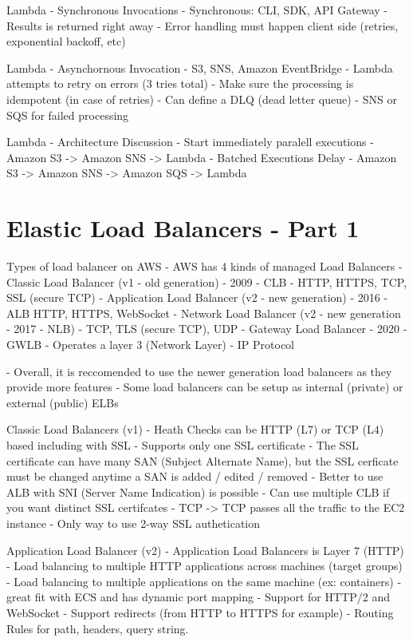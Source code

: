Lambda - Synchronous Invocations
- Synchronous: CLI, SDK, API Gateway
- Results is returned right away
- Error handling must happen client side (retries, exponential backoff, etc)

Lambda - Asynchornous Invocation
- S3, SNS, Amazon EventBridge
- Lambda attempts to retry on errors (3 tries total)
- Make sure the processing is idempotent (in case of retries)
- Can define a DLQ (dead letter queue) - SNS or SQS for failed processing

Lambda - Architecture Discussion
- Start immediately paralell executions
- Amazon S3 -> Amazon SNS -> Lambda
- Batched Executions Delay
- Amazon S3 -> Amazon SNS -> Amazon SQS -> Lambda


\section{Elastic Load Balancers - Part 1}
Types of load balancer on AWS
- AWS has 4 kinds of managed Load Balancers
- Classic Load Balancer (v1 - old generation) - 2009 - CLB
- HTTP, HTTPS, TCP, SSL (secure TCP)
- Application Load Balancer (v2 - new generation) - 2016 - ALB
HTTP, HTTPS, WebSocket
- Network Load Balancer (v2 - new generation - 2017 - NLB)
- TCP, TLS (secure TCP), UDP
- Gateway Load Balancer - 2020 - GWLB
- Operates a layer 3 (Network Layer) - IP Protocol

- Overall, it is reccomended to use the newer generation load balancers as they provide more features
- Some load balancers can be setup as internal (private) or external (public) ELBs

Classic Load Balancers (v1)
- Heath Checks can be HTTP (L7) or TCP (L4) based including with SSL
- Supports only one SSL certificate
- The SSL certificate can have many SAN (Subject Alternate Name), but the SSL cerficate must be changed anytime a SAN is added / edited / removed
- Better to use ALB with SNI (Server Name Indication) is possible
- Can use multiple CLB if you want distinct SSL certifcates
- TCP -> TCP passes all the traffic to the EC2 instance
- Only way to use 2-way SSL authetication

Application Load Balancer (v2)
- Application Load Balancers is Layer 7 (HTTP)
- Load balancing to multiple HTTP applications across machines (target groups)
- Load balancing to multiple applications on the same machine (ex: containers) - great fit with ECS and has dynamic port mapping
- Support for HTTP/2 and WebSocket
- Support redirects (from HTTP to HTTPS for example)
- Routing Rules for path, headers, query string.

